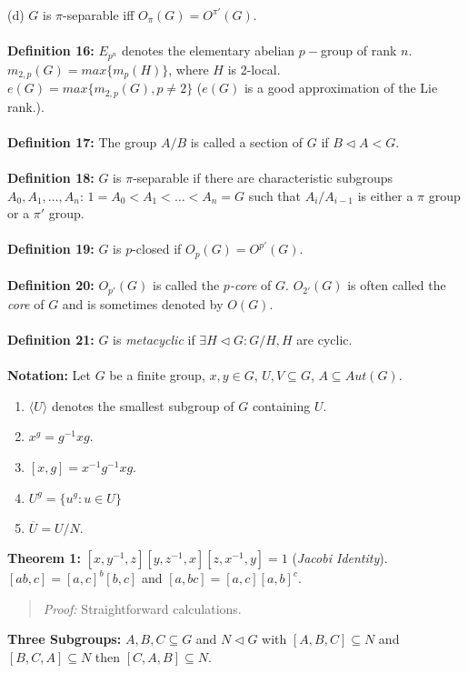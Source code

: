 (d) $G$ is $\pi$-separable iff $O_{\pi}(G) = O^{\pi'}(G)$.
\\
\\
{\bf Definition 16:}
$E_{p^n}$ denotes the elementary abelian $p-$group of rank $n$.
$m_{2,p}(G) = max \{ m_p (H) \}$, where $H$ is 2-local.
$e(G) = max \{ m_{2,p} (G), p \ne 2 \}$ ($e(G)$ is a good approximation of
the Lie rank.).
\\
\\
{\bf Definition 17:} The group $A/B$ is called a section of $G$ if $B \lhd A <G$.
\\
\\
{\bf Definition 18:} $G$ is $\pi$-separable if there are characteristic subgroups
$A_0, A_1, \ldots , A_n$: $1=A_0<A_1<\ldots<A_n=G$ such that $A_i/A_{i-1}$ is
either a $\pi$ group or a $\pi'$ group.
\\
\\
{\bf Definition 19:} $G$ is $p$-closed if $O_p(G)= O^{p'}(G)$.
\\
\\
{\bf Definition 20:}
$O_{p'}(G)$ is called the $p$\emph{-core} of $G$. $O_{2'}(G)$ is often called the
\emph{core} of $G$ and is sometimes denoted by $O(G)$.
\\
\\
{\bf Definition 21:}
$G$ is
\emph{metacyclic} if $\exists H \lhd G: G/H ,H$ are cyclic.
\\
\\
{\bf Notation:}  Let $G$ be a finite group, $x, y \in G$, $U, V \subseteq G$,
$A \subseteq Aut(G)$.
\begin{enumerate}
\item $ \langle U \rangle $ denotes the smallest subgroup of $G$ containing $U$.
\item $x^g= g^{-1}xg$.
\item $[x,g]= x^{-1} g^{-1} x g$.
\item $U^g= \{ u^g: u \in U \}$
\item ${\overline U} = U/N$.
\end{enumerate}
{\bf Theorem 1:}
$ [x, y^{-1}, z] [y, z^{-1}, x] [z, x^{-1}, y]=1$
(\emph{Jacobi Identity}).
$[ab,c]= [a,c]^b [b,c]$ and $[a,bc]=[a,c] [a,b]^c$.
\begin{quote}
\emph{Proof:} Straightforward calculations.
\end{quote}
{\bf Three Subgroups:} $A, B, C \subseteq G$ and
$N \lhd G$ with
$[A,B,C] \subseteq N$ and
$[B,C,A] \subseteq N$ then
$[C,A,B] \subseteq N$.
\\
\\
